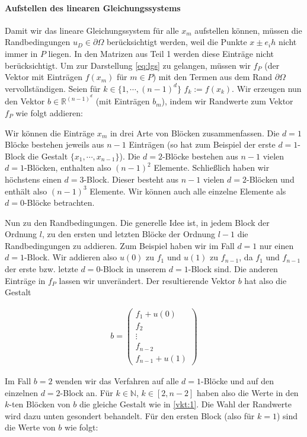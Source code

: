 \documentclass[smallheadings]{scrartcl}
\numberwithin{equation}{section}
\begin{document}
\paragraph{Aufstellen des linearen Gleichungssystems}

Damit wir das lineare Gleichungssystem für alle $x_m$ aufstellen können, müssen die Randbedingungen $u_D \in \partial\Omega$ berücksichtigt werden, weil die Punkte $x \pm e_ih$ nicht immer in $P$ liegen. In den Matrizen aus Teil 1 werden diese Einträge nicht berücksichtigt. Um zur Darstellung \eqref{eq:lgs} zu gelangen, müssen wir $f_P$ (der Vektor mit Einträgen $f(x_m)$ für $m \in P$) mit den Termen aus dem Rand $\partial\Omega$ vervollständigen. 
Seien für $k \in \{1, \dotsb, (n-1)^d\}$  $f_k :=f(x_k)$. Wir erzeugen nun den Vektor $b \in \mathbb{R}^{(n-1)^d}$ (mit Einträgen $b_m$), indem wir Randwerte zum Vektor $f_P$ wie folgt addieren:

Wir können die Einträge $x_m$ in drei Arte von Blöcken zusammenfassen. Die $d=1$ Blöcke bestehen jeweils aus $n-1$ Einträgen (so hat zum Beispiel der erste $d=1$-Block die Gestalt $\{x_1, \dotsb, x_{n-1}\}$). Die $d=2$-Blöcke bestehen aus $n-1$ vielen $d=1$-Blöcken, enthalten also $(n-1)^2$ Elemente. Schließlich haben wir höchstens einen $d=3$-Block. Dieser besteht aus $n-1$ vielen $d=2$-Blöcken und enthält also $(n-1)^3$ Elemente. Wir können auch alle einzelne Elemente als $d=0$-Blöcke betrachten.

Nun zu den Randbedingungen. Die generelle Idee ist, in jedem Block der Ordnung $l$, zu den ersten und letzten Blöcke der Ordnung $l-1$ die Randbedingungen zu addieren. 
Zum Beispiel haben wir im Fall $d=1$ nur einen $d=1$-Block. Wir addieren also $u(0)$ zu $f_1$ und $u(1)$ zu $f_{n-1}$, da $f_1$ und $f_{n-1}$ der erste bzw. letzte $d=0$-Block in unserem $d=1$-Block sind. Die anderen Einträge in $f_P$ lassen wir unverändert. Der resultierende Vektor $b$ hat also die Gestalt

\begin{align}
b=
\begin{pmatrix}
f_1 + u(0) \\
f_2	\\
\vdots	\\
f_{n-2}	\\
f_{n-1}+u(1)
\end{pmatrix}
\label{vkt:1}
\end{align}


Im Fall $b=2$ wenden wir das Verfahren auf alle $d=1$-Blöcke und auf den einzelnen $d=2$-Block an. Für $k\in \mathbb{N}$, $k \in [2, n-2]$ haben also die Werte in den $k$-ten Blöcken von $b$ die gleiche Gestalt wie in \ref{vkt:1}. Die Wahl der Randwerte wird dazu unten gesondert behandelt. Für den ersten Block (also für $k=1$) sind die Werte von $b$ wie folgt:
\end{document}
